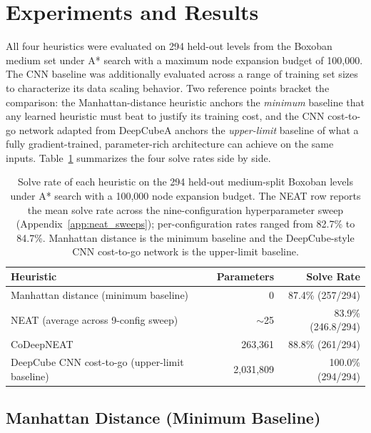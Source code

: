 \section{Experiments and Results}

All four heuristics were evaluated on 294 held-out levels from the Boxoban medium set
under A* search with a maximum node expansion budget of 100,000. The CNN baseline
was additionally evaluated across a range of training set sizes to characterize its
data scaling behavior. Two reference points bracket the comparison: the
Manhattan-distance heuristic anchors the \emph{minimum} baseline that any learned
heuristic must beat to justify its training cost, and the CNN cost-to-go network
adapted from DeepCubeA anchors the \emph{upper-limit} baseline of what a
fully gradient-trained, parameter-rich architecture can achieve on the same inputs.
Table~\ref{tab:results_summary} summarizes the four solve rates side by side.

\begin{table}[H]
\centering
\begin{tabular}{lrr}
\toprule
\textbf{Heuristic} & \textbf{Parameters} & \textbf{Solve Rate} \\
\midrule
Manhattan distance (minimum baseline)        & 0             & 87.4\% (257/294)   \\
NEAT (average across 9-config sweep)         & $\sim$25      & 83.9\% (246.8/294) \\
CoDeepNEAT                                   & 263{,}361     & 88.8\% (261/294)   \\
DeepCube CNN cost-to-go (upper-limit baseline) & 2{,}031{,}809 & 100.0\% (294/294)  \\
\bottomrule
\end{tabular}
\caption{Solve rate of each heuristic on the 294 held-out medium-split Boxoban levels under A* search with a 100{,}000 node expansion budget. The NEAT row reports the mean solve rate across the nine-configuration hyperparameter sweep (Appendix~\ref{app:neat_sweeps}); per-configuration rates ranged from 82.7\% to 84.7\%. Manhattan distance is the minimum baseline and the DeepCube-style CNN cost-to-go network is the upper-limit baseline.}
\label{tab:results_summary}
\end{table}

\subsection{Manhattan Distance (Minimum Baseline)}

